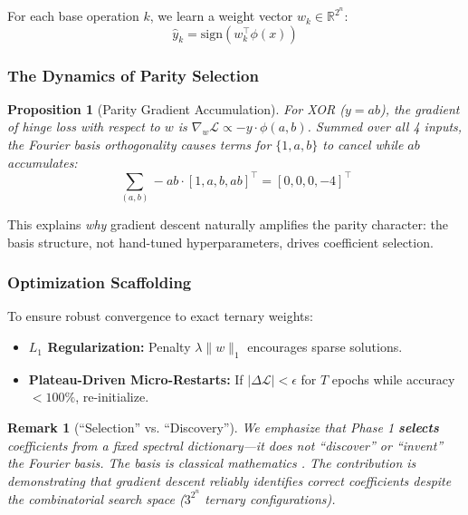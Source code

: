 \documentclass[Royal,times,sageh]{sagej}
\newcommand{\sign}{\text{sign}}
\newtheorem{proposition}{Proposition}
\newtheorem{remark}{Remark}
\begin{document}
For each base operation $k$, we learn a weight vector $w_k \in \mathbb{R}^{2^n}$:
\begin{equation}
    \hat{y}_k = \sign(w_k^\top \phi(x))
\end{equation}

\subsubsection{The Dynamics of Parity Selection}

\begin{proposition}[Parity Gradient Accumulation]
\label{prop:parity}
For XOR ($y = ab$), the gradient of hinge loss with respect to $w$ is $\nabla_w \mathcal{L} \propto -y \cdot \phi(a, b)$. Summed over all 4 inputs, the Fourier basis orthogonality causes terms for $\{1, a, b\}$ to cancel while $ab$ accumulates:
\begin{equation}
    \sum_{(a,b)} -ab \cdot [1, a, b, ab]^\top = [0, 0, 0, -4]^\top
\end{equation}
\end{proposition}

This explains \textit{why} gradient descent naturally amplifies the parity character: the basis structure, not hand-tuned hyperparameters, drives coefficient selection.

\subsubsection{Optimization Scaffolding}

To ensure robust convergence to exact ternary weights:
\begin{itemize}
    \item \textbf{$L_1$ Regularization:} Penalty $\lambda \|w\|_1$ encourages sparse solutions.
    \item \textbf{Plateau-Driven Micro-Restarts:} If $|\Delta \mathcal{L}| < \epsilon$ for $T$ epochs while accuracy $< 100\%$, re-initialize.
\end{itemize}

\begin{remark}[``Selection'' vs. ``Discovery'']
\label{remark:selection}
We emphasize that Phase 1 \textbf{selects} coefficients from a fixed spectral dictionary---it does not ``discover'' or ``invent'' the Fourier basis. The basis is classical mathematics \cite{odonnell2014analysis}. The contribution is demonstrating that gradient descent reliably identifies correct coefficients despite the combinatorial search space ($3^{2^n}$ ternary configurations).
\end{remark}
\end{document}
